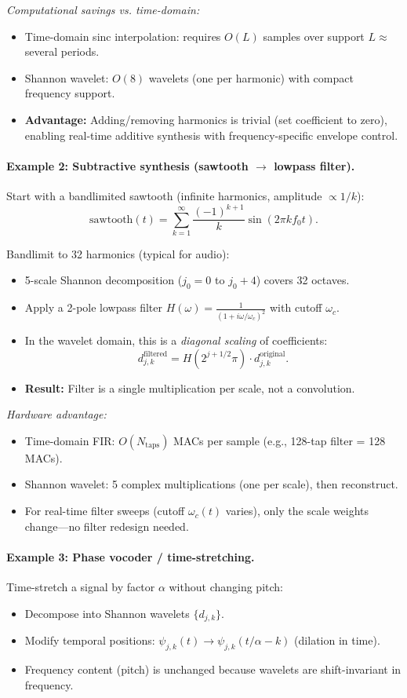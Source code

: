 \emph{Computational savings vs. time-domain:}
\begin{itemize}
\item Time-domain sinc interpolation: requires $O(L)$ samples over support $L \approx$ several periods.
\item Shannon wavelet: $O(8)$ wavelets (one per harmonic) with compact frequency support.
\item \textbf{Advantage:} Adding/removing harmonics is trivial (set coefficient to zero), enabling real-time additive synthesis with frequency-specific envelope control.
\end{itemize}

\paragraph{Example 2: Subtractive synthesis (sawtooth $\to$ lowpass filter).}
Start with a bandlimited sawtooth (infinite harmonics, amplitude $\propto 1/k$):
\[
\text{sawtooth}(t) = \sum_{k=1}^{\infty} \frac{(-1)^{k+1}}{k} \sin(2\pi k f_0 t).
\]

Bandlimit to 32 harmonics (typical for audio):
\begin{itemize}
\item 5-scale Shannon decomposition ($j_0 = 0$ to $j_0 + 4$) covers 32 octaves.
\item Apply a 2-pole lowpass filter $H(\omega) = \frac{1}{(1 + i\omega/\omega_c)^2}$ with cutoff $\omega_c$.
\item In the wavelet domain, this is a \emph{diagonal scaling} of coefficients:
\[
d_{j,k}^{\text{filtered}} = H(2^{j+1/2}\pi) \cdot d_{j,k}^{\text{original}}.
\]
\item \textbf{Result:} Filter is a single multiplication per scale, not a convolution.
\end{itemize}

\emph{Hardware advantage:}
\begin{itemize}
\item Time-domain FIR: $O(N_{\text{taps}})$ MACs per sample (e.g., 128-tap filter = 128 MACs).
\item Shannon wavelet: 5 complex multiplications (one per scale), then reconstruct.
\item For real-time filter sweeps (cutoff $\omega_c(t)$ varies), only the scale weights change—no filter redesign needed.
\end{itemize}

\paragraph{Example 3: Phase vocoder / time-stretching.}
Time-stretch a signal by factor $\alpha$ without changing pitch:
\begin{itemize}
\item Decompose into Shannon wavelets $\{d_{j,k}\}$.
\item Modify temporal positions: $\psi_{j,k}(t) \to \psi_{j,k}(t/\alpha - k)$ (dilation in time).
\item Frequency content (pitch) is unchanged because wavelets are shift-invariant in frequency.
\end{itemize}

